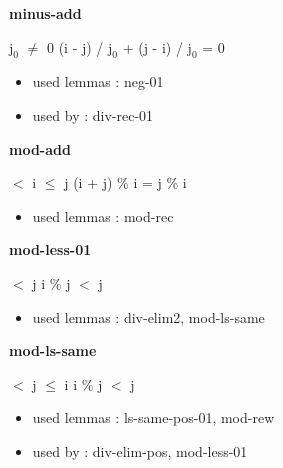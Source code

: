 \documentclass[a4paper]{article}
\begin{document}
\medskip

\bigskip

{\large\bf minus-add}

\medskip

$\mbox{j}_{0}$ $\neq$ 0 \Fol (i - j) / $\mbox{j}_{0}$ + (j - i) / $\mbox{j}_{0}$ = 0

\begin{itemize}


\item       used lemmas  : neg-01
\item       used by      : div-rec-01

\end{itemize}

\medskip

\bigskip

{\large\bf mod-add}

\medskip

  $<$ i  $\le$ j \Imp (i + j) \% i = j \% i

\begin{itemize}


\item       used lemmas  : mod-rec

\end{itemize}

\medskip

\bigskip

{\large\bf mod-less-01}

\medskip

  $<$ j \Imp i \% j $<$ j

\begin{itemize}


\item       used lemmas  : div-elim2, mod-ls-same

\end{itemize}

\medskip

\bigskip

{\large\bf mod-ls-same}

\medskip

  $<$ j  $\le$ i \Imp i \% j $<$ j

\begin{itemize}


\item       used lemmas  : ls-same-pos-01, mod-rew
\item       used by      : div-elim-pos, mod-less-01

\end{itemize}
\end{document}

